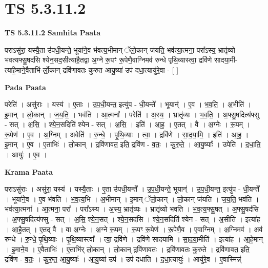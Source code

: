 \documentclass[17pt]{extarticle}
\begin{document}
\section{ TS 5.3.11.2 }

\textbf{TS 5.3.11.2 } \newline
\textbf{Samhita Paata} \newline

पराऽसु॑रा॒ यस्यै॒ता उ॑पधी॒यन्ते॒ भूया॑ने॒व भ॑वत्य॒भीमान् ॅलो॒कान् ज॑यति॒ भव॑त्या॒त्मना॒ परा᳚ऽस्य॒ भ्रातृ॑व्यो भवत्यफ्सु॒षद॑सि श्येन॒सद॒सीत्या॑है॒तद्वा अ॒ग्ने रू॒पꣳ रू॒पेणै॒वाग्निमव॑ रुन्धे पृथि॒व्यास्त्वा॒ द्रवि॑णे सादया॒मी-त्या॑हे॒माने॒वैताभि॑-र्लो॒कान् द्रवि॑णावतः कुरुत आयु॒ष्या॑ उप॑ दधा॒त्यायु॑रे॒वा - [  ] \newline

\textbf{Pada Paata} \newline

परेति॑ । असु॑राः । यस्य॑ । ए॒ताः । उ॒प॒धी॒यन्त॒ इत्यु॑प - धी॒यन्ते᳚ । भूयान्॑ । ए॒व । भ॒व॒ति॒ । अ॒भीति॑ । इ॒मान् । लो॒कान् । ज॒य॒ति॒ । भव॑ति । आ॒त्मना᳚ । परेति॑ । अ॒स्य॒ । भ्रातृ॑व्यः । भ॒व॒ति॒ । अ॒फ्सु॒षदित्य॑फ्सु - सत् । अ॒सि॒ । श्ये॒न॒सदिति॑ श्येन - सत् । अ॒सि॒ । इति॑ । आ॒ह॒ । ए॒तत् । वै । अ॒ग्नेः । रू॒पम् । रू॒पेण॑ । ए॒व । अ॒ग्निम् । अवेति॑ । रु॒न्धे॒ । पृ॒थि॒व्याः । त्वा॒ । द्रवि॑णे । सा॒द॒या॒मि॒ । इति॑ । आ॒ह॒ । इ॒मान् । ए॒व । ए॒ताभिः॑ । लो॒कान् । द्रवि॑णावत॒ इति॒ द्रवि॑ण - व॒तः॒ । कु॒रु॒ते॒ । आ॒यु॒ष्याः᳚ । उपेति॑ । द॒धा॒ति॒ । आयुः॑ । ए॒व ।  \newline


\textbf{Krama Paata} \newline

पराऽसु॑राः । असु॑रा॒ यस्य॑ । यस्यै॒ताः । ए॒ता उ॑पधी॒यन्ते᳚ । उ॒प॒धी॒यन्ते॒ भूयान्॑ । उ॒प॒धी॒यन्त॒ इत्यु॑प - धी॒यन्ते᳚ । भूया॑ने॒व । ए॒व भ॑वति । भ॒व॒त्य॒भि । अ॒भीमान् । इ॒मान् ॅलो॒कान् । लो॒कान् ज॑यति । ज॒य॒ति॒ भव॑ति । भव॑त्या॒त्मना᳚ । आ॒त्मना॒ परा᳚ । परा᳚ऽस्य । अ॒स्य॒ भ्रातृ॑व्यः । भ्रातृ॑व्यो भवति । भ॒व॒त्य॒फ्सु॒षत् । अ॒फ्सु॒षद॑सि । अ॒फ्सु॒षदित्य॑फ्सु - सत् । अ॒सि॒ श्ये॒न॒सत् । श्ये॒न॒सद॑सि । श्ये॒न॒सदिति॑ श्येन - सत् । अ॒सीति॑ । इत्या॑ह । आ॒है॒तत् । ए॒तद् वै । वा अ॒ग्नेः । अ॒ग्ने रू॒पम् । रू॒पꣳ रू॒पेण॑ । रू॒पेणै॒व । ए॒वाग्निम् । अ॒ग्निमव॑ । अव॑ रुन्धे । रु॒न्धे॒ पृ॒थि॒व्याः । पृ॒थि॒व्यास्त्वा᳚ । त्वा॒ द्रवि॑णे । द्रवि॑णे सादयामि । सा॒द॒या॒मीति॑ । इत्या॑ह । आ॒हे॒मान् । इ॒माने॒व । ए॒वैताभिः॑ । ए॒ताभि॑र् लो॒कान् । लो॒कान् द्रवि॑णावतः । द्रवि॑णावतः कुरुते । द्रवि॑णावत॒ इति॒ द्रवि॑ण - व॒तः॒ । कु॒रु॒त॒ आ॒यु॒ष्याः᳚ । आ॒यु॒ष्या॑ उप॑ । उप॑ दधाति । द॒धा॒त्यायुः॑ । आयु॑रे॒व । ए॒वास्मिन्न्॑ \newline
\end{document}
